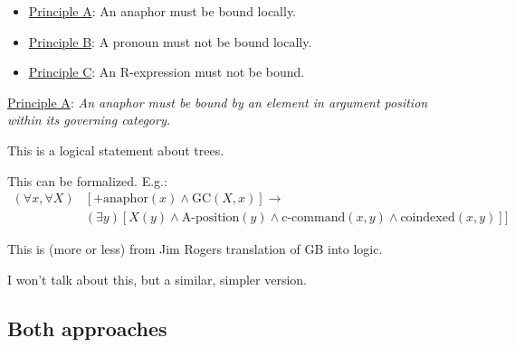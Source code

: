 \documentclass{beamer}
\newcommand{\tree}[1]{
	\begin{forest}
		for tree={
		inner sep=0pt,
	    parent anchor=south,
	  },
	  before typesetting nodes={%
	    where content={}{%
	      text width=.001pt,
	      inner sep=0pt,
	      before drawing tree={%
	        shape=coordinate,
	        typeset node,
	      },
	      for parent={
	        for children={
	          anchor=north,
	        }
	      }
	    }{}
	  }
	  #1
	\end{forest}
}
\begin{document}
\begin{frame}
	\begin{itemize}
	\item	\uline{Principle A}: An anaphor must be bound locally.
	\item	\uline{Principle B}: A pronoun must not be bound locally.
	\item	\uline{Principle C}: An R-expression must not be bound.
	\end{itemize}
	\pause
\begin{small}
\end{small}
\end{frame}

\begin{frame}
\uline{Principle A}: \emph{An anaphor must be bound by an element in argument position within its governing category.}

This is a logical statement about trees.

\pause

This can be formalized. 
E.g.:
\begin{align*}
	(\forall x,\forall X)	&[+\mathrm{anaphor}(x)\land \mathrm{GC}(X,x)]\to\\
					&(\exists y)[X(y)\land \mathrm{A\mbox{-}position}(y)\land \mathrm{c\mbox{-}command}(x,y) \land \mathrm{coindexed}(x,y)]]
\end{align*}
\pause

This is (more or less) from Jim Rogers translation of GB into logic.

I won't talk about this, but a similar, simpler version.
\end{frame}

\subsection{Both approaches}%
\end{document}
